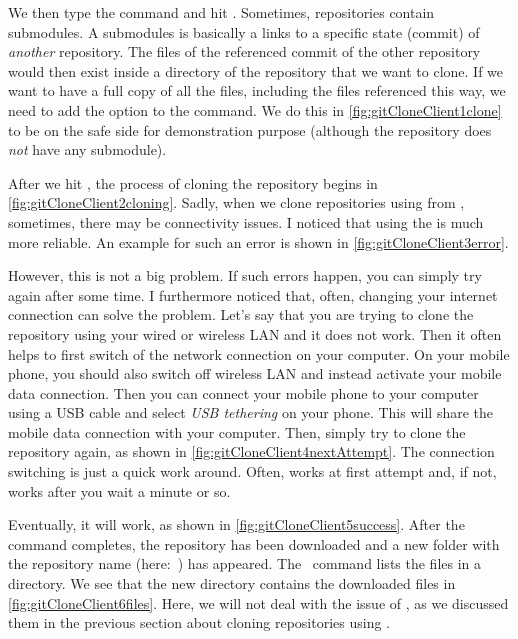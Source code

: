 We then type the command  and hit \keys{\enter}.
Sometimes, repositories contain submodules.
A submodules is basically a links to a specific state (commit) of \emph{another} repository.
The files of the referenced commit of the other repository would then exist inside a directory of the repository that we want to clone.
If we want to have a full copy of all the files, including the files referenced this way, we need to add the option  to the  command.
We do this in \cref{fig:gitCloneClient1clone} to be on the safe side for demonstration purpose (although the repository  does \emph{not} have any submodule).

After we hit \keys{\enter}, the process of cloning the repository begins in \cref{fig:gitCloneClient2cloning}.
Sadly, when we clone repositories using   from \github, sometimes, there may be connectivity issues.
I noticed that using the   is much more reliable.
An example for such an error is shown in \cref{fig:gitCloneClient3error}.

However, this is not a big problem.
If such errors happen, you can simply try again after some time.
I furthermore noticed that, often, changing your internet connection can solve the problem.
Let's say that you are trying to clone the repository using your wired or wireless LAN and it does not work.
Then it often helps to first switch of the network connection on your computer.
On your mobile phone, you should also switch off wireless LAN and instead activate your mobile data connection.
Then you can connect your mobile phone to your computer using a USB cable and select \emph{USB tethering} on your phone.
This will share the mobile data connection with your computer.
Then, simply try to clone the repository again, as shown in \cref{fig:gitCloneClient4nextAttempt}.
The connection switching is just a quick work around.
Often,  works at first attempt and, if not, works after you wait a minute or so.

Eventually, it will work, as shown in \cref{fig:gitCloneClient5success}.
After the  command completes, the repository has been downloaded and a new folder with the repository name (here:~) has appeared.
The \bash\ command  lists the files in a directory.
We see that the new directory contains the downloaded files in \cref{fig:gitCloneClient6files}.
Here, we will not deal with the issue of , as we discussed them in the previous section about cloning repositories using \pycharm.%
%
\FloatBarrier%
\endhsection%
